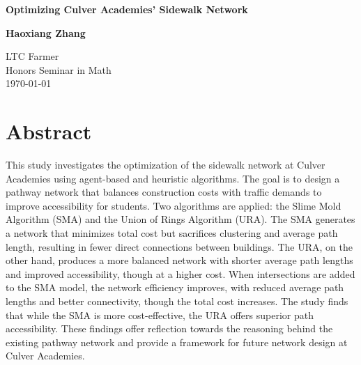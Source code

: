 \documentclass[11pt]{article}
\begin{document}
\begin{titlepage}
\begin{center}
 {\huge\bfseries Optimizing Culver Academies' Sidewalk Network}

 \vspace{1.5cm}
 {\Large\bfseries Haoxiang Zhang}\\[5pt]

 \vspace{2cm}

 \vfill
{LTC Farmer}\\
{Honors Seminar in Math}\\[5pt]
 \vfill
\today{}
\end{center}
\end{titlepage}
\newpage
\tableofcontents
\section{Abstract}
This study investigates the optimization of the sidewalk network at Culver Academies using agent-based and heuristic algorithms. The goal is to design a pathway network that balances construction costs with traffic demands to improve accessibility for students. Two algorithms are applied: the Slime Mold Algorithm (SMA) and the Union of Rings Algorithm (URA). The SMA generates a network that minimizes total cost but sacrifices clustering and average path length, resulting in fewer direct connections between buildings. The URA, on the other hand, produces a more balanced network with shorter average path lengths and improved accessibility, though at a higher cost. When intersections are added to the SMA model, the network efficiency improves, with reduced average path lengths and better connectivity, though the total cost increases. The study finds that while the SMA is more cost-effective, the URA offers superior path accessibility. These findings offer reflection towards the reasoning behind the existing pathway network and provide a framework for future network design at Culver Academies. 
\end{document}
